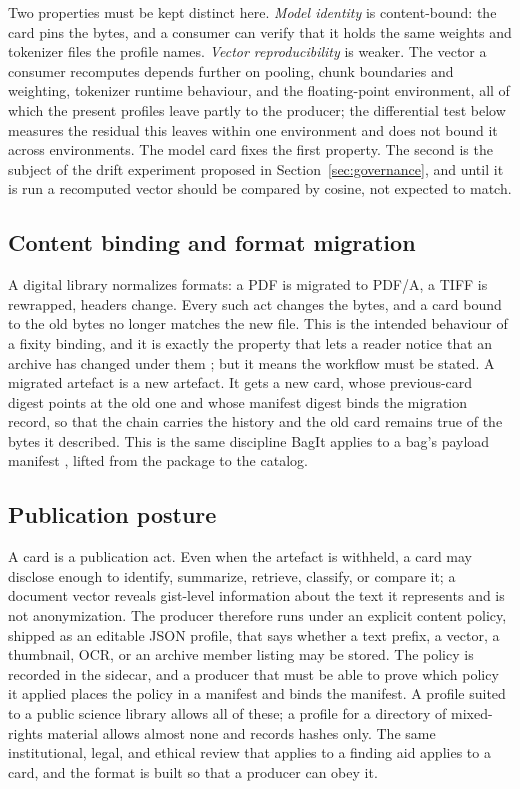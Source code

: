 \documentclass[sigconf]{acmart}
\begin{document}
Two properties must be kept distinct here. \emph{Model identity} is
content-bound: the card pins the bytes, and a consumer can verify that it
holds the same weights and tokenizer files the profile names. \emph{Vector
reproducibility} is weaker. The vector a consumer recomputes depends further
on pooling, chunk boundaries and weighting, tokenizer runtime behaviour, and
the floating-point environment, all of which the present profiles leave
partly to the producer; the differential test below measures the residual
this leaves within one environment and does not bound it across
environments. The model card fixes the first property. The second is the
subject of the drift experiment proposed in Section~\ref{sec:governance}, and
until it is run a recomputed vector should be compared by cosine, not
expected to match.

\subsection{Content binding and format migration}

A digital library normalizes formats: a PDF is migrated to PDF/A, a TIFF is
rewrapped, headers change. Every such act changes the bytes, and a card bound
to the old bytes no longer matches the new file. This is the intended
behaviour of a fixity binding, and it is exactly the property that lets a
reader notice that an archive has changed under them \cite{Lerner:2017,
Aturban:2019}; but it means the workflow must be stated. A migrated artefact
is a new artefact. It gets a new card, whose previous-card digest points at the
old one and whose manifest digest binds the migration record, so that the
chain carries the history and the old card remains true of the bytes it
described. This is the same discipline BagIt applies to a bag's payload
manifest \cite{Kunze:2018}, lifted from the package to the catalog.

\subsection{Publication posture}

A card is a publication act. Even when the artefact is withheld, a card may
disclose enough to identify, summarize, retrieve, classify, or compare it; a
document vector reveals gist-level information about the text it represents
and is not anonymization. The producer therefore runs under an explicit
content policy, shipped as an editable JSON profile, that says whether a text
prefix, a vector, a thumbnail, OCR, or an archive member listing may be
stored. The policy is recorded in the sidecar, and a producer that must be
able to prove which policy it applied places the policy in a manifest and
binds the manifest. A profile suited to a public science library allows all
of these; a profile for a directory of mixed-rights material allows almost
none and records hashes only. The same institutional, legal, and ethical
review that applies to a finding aid applies to a card, and the format is
built so that a producer can obey it.
\end{document}
